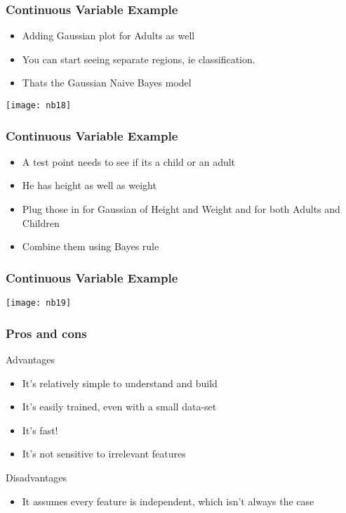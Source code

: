 \begin{frame}[fragile]\frametitle{Continuous Variable Example}
\begin{itemize}
\item Adding Gaussian plot for Adults as well
\item You can start seeing separate regions, ie classification.
\item Thats the Gaussian Naive Bayes model
\end{itemize}
\begin{center}
\texttt{[image: nb18]}
\end{center}
\end{frame}


\begin{frame}[fragile]\frametitle{Continuous Variable Example}
\begin{itemize}
\item A test point needs to see if its a child or an adult
\item He has height as well as weight
\item Plug those in for Gaussian of Height and Weight and for both Adults and Children
\item Combine them using Bayes rule
\end{itemize}
\end{frame}

\begin{frame}[fragile]\frametitle{Continuous Variable Example}
\begin{center}
\texttt{[image: nb19]}
\end{center}
\end{frame}






\begin{frame}[fragile]\frametitle{Pros and cons}
Advantages
\begin{itemize}
\item     It's relatively simple to understand and build
\item     It's easily trained, even with a small data-set
\item     It's fast!
\item     It's not sensitive to irrelevant features
\end{itemize}
Disadvantages
\begin{itemize}
\item     It assumes every feature is independent, which isn't always the case
\end{itemize}
\end{frame}




